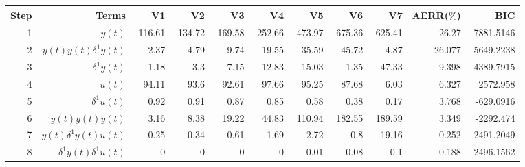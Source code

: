 \begin{tabular}{rrrrrrrrrrr}
Step & Terms & V1 & V2 & V3 & V4 & V5 & V6 & V7 & AERR($\%$) & BIC \\ 
\hline 
1 & $y(t)$ & -116.61 & -134.72 & -169.58 & -252.66 & -473.97 & -675.36 & -625.41 & 26.27 & 7881.5146 \\ 
2 & $y(t)y(t)\delta^1 y(t)$ & -2.37 & -4.79 & -9.74 & -19.55 & -35.59 & -45.72 & 4.87 & 26.077 & 5649.2238 \\ 
3 & $\delta^1 y(t)$ & 1.18 & 3.3 & 7.15 & 12.83 & 15.03 & -1.35 & -47.33 & 9.398 & 4389.7915 \\ 
4 & $u(t)$ & 94.11 & 93.6 & 92.61 & 97.66 & 95.25 & 87.68 & 6.03 & 6.327 & 2572.958 \\ 
5 & $\delta^1 u(t)$ & 0.92 & 0.91 & 0.87 & 0.85 & 0.58 & 0.38 & 0.17 & 3.768 & -629.0916 \\ 
6 & $y(t)y(t)y(t)$ & 3.16 & 8.38 & 19.22 & 44.83 & 110.94 & 182.55 & 189.59 & 3.349 & -2292.474 \\ 
7 & $y(t)\delta^1 y(t)u(t)$ & -0.25 & -0.34 & -0.61 & -1.69 & -2.72 & 0.8 & -19.16 & 0.252 & -2491.2049 \\ 
8 & $\delta^1 y(t)\delta^1 u(t)$ & 0 & 0 & 0 & 0 & -0.01 & -0.08 & 0.1 & 0.188 & -2496.1562 \\ 
\hline 
\end{tabular}